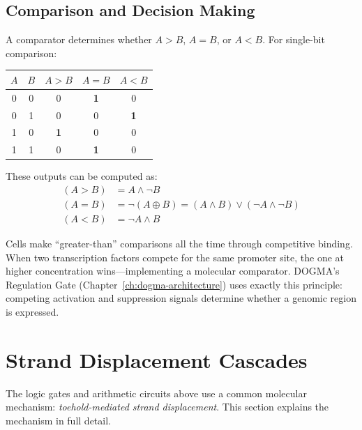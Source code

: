 \subsection{Comparison and Decision Making}

A comparator determines whether $A > B$, $A = B$, or $A < B$. For single-bit comparison:

\begin{center}
\renewcommand{\arraystretch}{1.15}
\begin{tabular}{cc|ccc}
\toprule
\textbf{$A$} & \textbf{$B$} & \textbf{$A > B$} & \textbf{$A = B$} & \textbf{$A < B$} \\
\midrule
0 & 0 & 0 & \textbf{1} & 0 \\
0 & 1 & 0 & 0 & \textbf{1} \\
1 & 0 & \textbf{1} & 0 & 0 \\
1 & 1 & 0 & \textbf{1} & 0 \\
\bottomrule
\end{tabular}
\end{center}

These outputs can be computed as:
\begin{align}
(A > B) &= A \wedge \neg B \\
(A = B) &= \neg(A \oplus B) = (A \wedge B) \vee (\neg A \wedge \neg B) \\
(A < B) &= \neg A \wedge B
\end{align}

\begin{bioinsight}
Cells make ``greater-than'' comparisons all the time through competitive binding. When two transcription factors compete for the same promoter site, the one at higher concentration wins---implementing a molecular comparator. DOGMA's Regulation Gate (Chapter~\ref{ch:dogma-architecture}) uses exactly this principle: competing activation and suppression signals determine whether a genomic region is expressed.
\end{bioinsight}

\section{Strand Displacement Cascades}
\label{sec:strand-displacement}

The logic gates and arithmetic circuits above use a common molecular mechanism: \emph{toehold-mediated strand displacement}. This section explains the mechanism in full detail.

